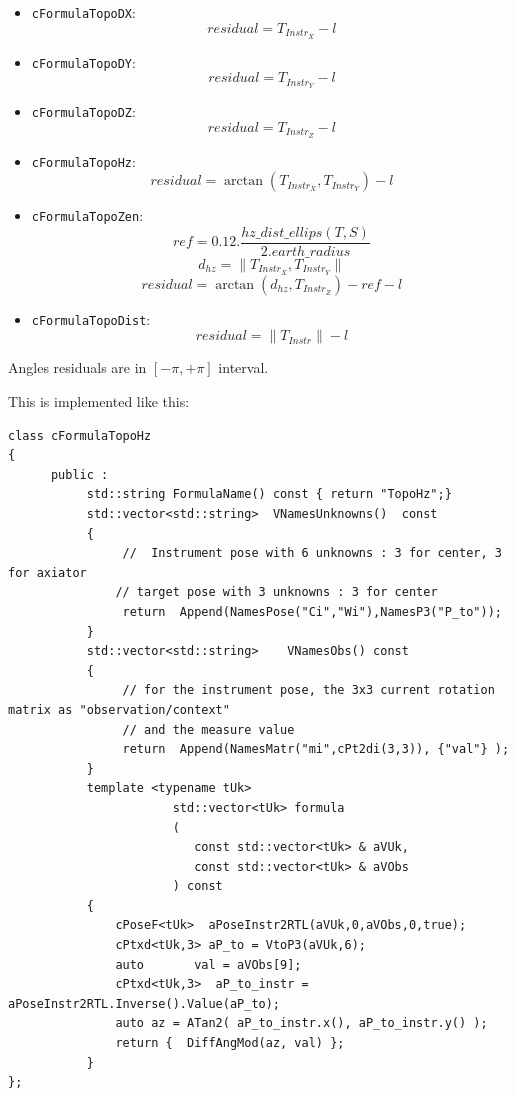  \begin{itemize}
    \item {\tt cFormulaTopoDX}: $$ residual = T_{Instr_X} - l$$
    \item {\tt cFormulaTopoDY}: $$ residual = T_{Instr_Y} - l$$
    \item {\tt cFormulaTopoDZ}: $$ residual = T_{Instr_Z} - l$$

    \item {\tt cFormulaTopoHz}: $$ residual =  \arctan\left(T_{Instr_X}, T_{Instr_Y}\right) - l $$
    \item {\tt cFormulaTopoZen}:
    $$ ref = 0.12 . \frac { hz\_dist\_ellips\left( T, S \right) }
                          { 2 . earth\_radius} $$
    $$ d_{hz} =  \| T_{Instr_X}, T_{Instr_Y} \| $$
    $$ residual =  \arctan\left(d_{hz}, T_{Instr_Z}\right) - ref - l $$
    \item {\tt cFormulaTopoDist}: $$  residual =  \| T_{Instr} \| - l $$

 \end{itemize}

Angles residuals are in $\left[ -\pi, + \pi \right]$ interval.

This is implemented like this:
\begin{lstlisting}
class cFormulaTopoHz
{
      public :
           std::string FormulaName() const { return "TopoHz";}
           std::vector<std::string>  VNamesUnknowns()  const
           {
                //  Instrument pose with 6 unknowns : 3 for center, 3 for axiator
               // target pose with 3 unknowns : 3 for center
                return  Append(NamesPose("Ci","Wi"),NamesP3("P_to"));
           }
           std::vector<std::string>    VNamesObs() const
           {
                // for the instrument pose, the 3x3 current rotation matrix as "observation/context"
                // and the measure value
                return  Append(NamesMatr("mi",cPt2di(3,3)), {"val"} );
           }
           template <typename tUk>
                       std::vector<tUk> formula
                       (
                          const std::vector<tUk> & aVUk,
                          const std::vector<tUk> & aVObs
                       ) const
           {
               cPoseF<tUk>  aPoseInstr2RTL(aVUk,0,aVObs,0,true);
               cPtxd<tUk,3> aP_to = VtoP3(aVUk,6);
               auto       val = aVObs[9];
               cPtxd<tUk,3>  aP_to_instr = aPoseInstr2RTL.Inverse().Value(aP_to);
               auto az = ATan2( aP_to_instr.x(), aP_to_instr.y() );
               return {  DiffAngMod(az, val) };
           }
};

\end{lstlisting}

